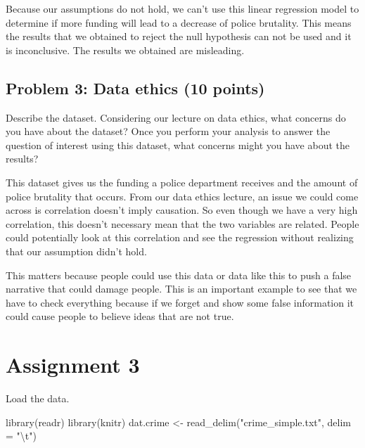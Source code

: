 \documentclass[
]{article}
\newenvironment{Shaded}{\begin{snugshade}}{\end{snugshade}}
\newcommand{\AttributeTok}[1]{\textcolor[rgb]{0.77,0.63,0.00}{#1}}
\newcommand{\FunctionTok}[1]{\textcolor[rgb]{0.00,0.00,0.00}{#1}}
\newcommand{\NormalTok}[1]{#1}
\newcommand{\OtherTok}[1]{\textcolor[rgb]{0.56,0.35,0.01}{#1}}
\newcommand{\SpecialCharTok}[1]{\textcolor[rgb]{0.00,0.00,0.00}{#1}}
\newcommand{\StringTok}[1]{\textcolor[rgb]{0.31,0.60,0.02}{#1}}
\begin{document}
Because our assumptions do not hold, we can't use this linear regression
model to determine if more funding will lead to a decrease of police
brutality. This means the results that we obtained to reject the null
hypothesis can not be used and it is inconclusive. The results we
obtained are misleading.

\hypertarget{problem-3-data-ethics-10-points}{%
\subsection{Problem 3: Data ethics (10
points)}\label{problem-3-data-ethics-10-points}}

Describe the dataset. Considering our lecture on data ethics, what
concerns do you have about the dataset? Once you perform your analysis
to answer the question of interest using this dataset, what concerns
might you have about the results?

This dataset gives us the funding a police department receives and the
amount of police brutality that occurs. From our data ethics lecture, an
issue we could come across is correlation doesn't imply causation. So
even though we have a very high correlation, this doesn't necessary mean
that the two variables are related. People could potentially look at
this correlation and see the regression without realizing that our
assumption didn't hold.

This matters because people could use this data or data like this to
push a false narrative that could damage people. This is an important
example to see that we have to check everything because if we forget and
show some false information it could cause people to believe ideas that
are not true.

\hypertarget{assignment-3}{%
\section{Assignment 3}\label{assignment-3}}

Load the data.

\begin{Shaded}
\begin{Highlighting}[]
\FunctionTok{library}\NormalTok{(readr)}
\FunctionTok{library}\NormalTok{(knitr)}
\NormalTok{dat.crime }\OtherTok{\textless{}{-}} \FunctionTok{read\_delim}\NormalTok{(}\StringTok{"crime\_simple.txt"}\NormalTok{, }\AttributeTok{delim =} \StringTok{"}\SpecialCharTok{\textbackslash{}t}\StringTok{"}\NormalTok{)}
\end{Highlighting}
\end{Shaded}
\end{document}

